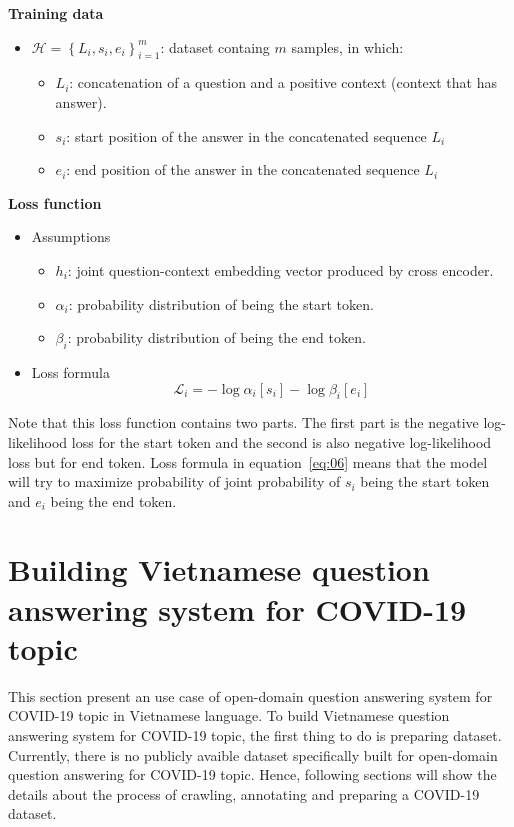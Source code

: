 \documentclass[12pt, sort&compress]{report}
\begin{document}
\par \textbf{Training data}
\begin{itemize}
	\item $\mathcal{H} = \left\{ L_i, s_i, e_i\right\}_{i=1}^{m}$: dataset containg $m$ samples, in which:
	\begin{itemize}
		\item $L_i$: concatenation of a question and a positive context (context that has answer).
		\item $s_i$: start position of the answer in the concatenated sequence $L_i$
		\item $e_i$: end position of the answer in the concatenated sequence $L_i$
	\end{itemize}
\end{itemize}
\par \textbf{Loss function}
\begin{itemize}
	\item Assumptions
	\begin{itemize}
		\item $h_i$: joint question-context embedding vector produced by cross encoder.
		\item $\alpha_i$: probability distribution of being the start token.
		\item $\beta_i$: probability distribution of being the end token.
	\end{itemize}
	\item Loss formula 
	\begin{equation}\label{eq:06}\mathcal{L}_i = -\log\alpha_i[s_i] - \log\beta_i[e_i]\end{equation}
\end{itemize}
Note that this loss function contains two parts. The first part is the negative log-likelihood loss for the start token and the second is also negative log-likelihood loss but for end token. Loss formula in equation~\eqref{eq:06} means that the model will try to maximize probability of joint probability of $s_i$ being the start token and $e_i$ being the end token.

\section{Building Vietnamese question answering system for COVID-19 topic}
This section present an use case of open-domain question answering system for COVID-19 topic in Vietnamese language. To build Vietnamese question answering system for COVID-19 topic, the first thing to do is preparing dataset. Currently, there is no publicly avaible dataset specifically built for open-domain question answering for COVID-19 topic. Hence, following sections will show the details about the process of crawling, annotating and preparing a COVID-19 dataset.
\end{document}
